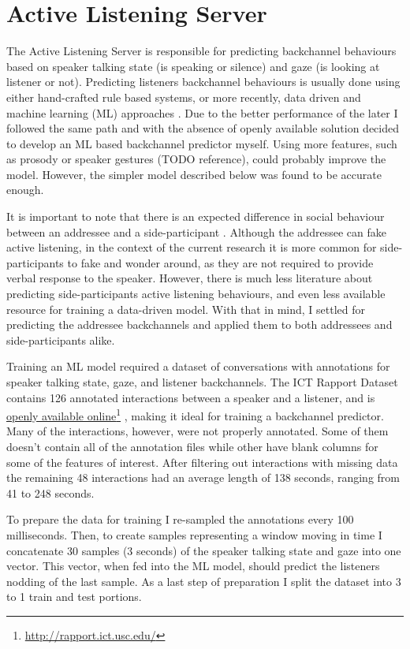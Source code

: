 \documentclass[]{simple-thesis}
\newcommand\fnurl[2]{%
  \href{#2}{#1}\footnote{\url{#2}}%
}
\begin{document}
\section{Active Listening Server}

The Active Listening Server is responsible for predicting backchannel behaviours based on speaker talking state (is speaking or silence) and gaze (is looking at listener or not).
Predicting listeners backchannel behaviours is usually done using either hand-crafted rule based systems, or more recently, data driven and machine learning (ML) approaches \citep{Morency2008}.
Due to the better performance of the later I followed the same path and with the absence of openly available solution decided to develop an ML based backchannel predictor myself.
Using more features, such as prosody \citep{Ward2000} or speaker gestures (TODO reference), could probably improve the model.
However, the simpler model described below was found to be accurate enough.

It is important to note that there is an expected difference in social behaviour between an addressee and a side-participant \citep{Clark1982}.
Although the addressee can fake active listening, in the context of the current research it is more common for side-participants to fake and wonder around, as they are not required to provide verbal response to the speaker.
However, there is much less literature about predicting side-participants active listening behaviours, and even less available resource for training a data-driven model.
With that in mind, I settled for predicting the addressee backchannels and applied them to both addressees and side-participants alike.

Training an ML model required a dataset of conversations with annotations for speaker talking state, gaze, and listener backchannels.
The ICT Rapport Dataset \citep{Gratch2007} contains 126 annotated interactions between a speaker and a listener, and is \fnurl{openly available online}{http://rapport.ict.usc.edu/}, making it ideal for training a backchannel predictor.
Many of the interactions, however, were not properly annotated.
Some of them doesn't contain all of the annotation files while other have blank columns for some of the features of interest.
After filtering out interactions with missing data the remaining 48 interactions had an average length of 138 seconds, ranging from 41 to 248 seconds.

To prepare the data for training I re-sampled the annotations every 100 milliseconds.
Then, to create samples representing a window moving in time I concatenate 30 samples (3 seconds) of the speaker talking state and gaze into one vector.
This vector, when fed into the ML model, should predict the listeners nodding of the last sample.
As a last step of preparation I split the dataset into 3 to 1 train and test portions.
\end{document}
